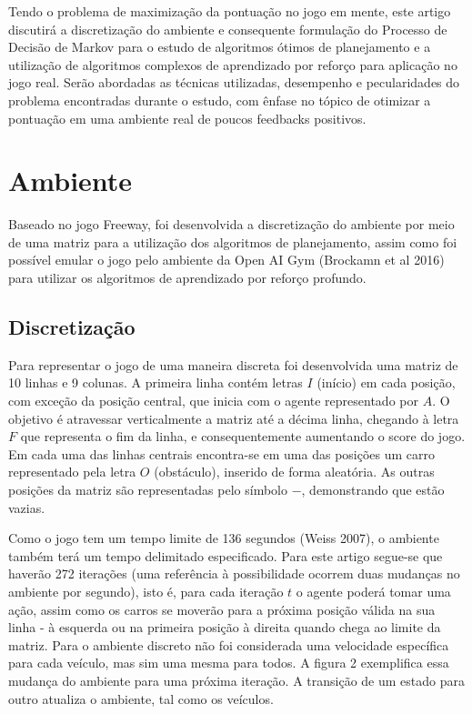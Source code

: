 \documentclass[letterpaper]{article} %
\begin{document}
Tendo o problema de maximização da pontuação no jogo em mente, este artigo discutirá a discretização do ambiente e consequente formulação do Processo de Decisão de Markov para o estudo de algoritmos ótimos de planejamento e a utilização de algoritmos complexos de aprendizado por reforço para aplicação no jogo real. Serão abordadas as técnicas utilizadas, desempenho e pecularidades do problema encontradas durante o estudo, com ênfase no tópico de otimizar a pontuação em uma ambiente real de poucos feedbacks positivos.

\section{Ambiente}
Baseado no jogo Freeway, foi desenvolvida a discretização do ambiente por meio de uma matriz para a utilização dos algoritmos de planejamento, assim como foi possível emular o jogo pelo ambiente da Open AI Gym (Brockamn et al 2016) para utilizar os algoritmos de aprendizado por reforço profundo.

\subsection{Discretização}
Para representar o jogo de uma maneira discreta foi desenvolvida uma matriz de 10 linhas e 9 colunas. A primeira linha contém letras $I$ (início) em cada posição, com exceção da posição central, que inicia com o agente representado por $A$. O objetivo é atravessar verticalmente a matriz até a décima linha, chegando à letra $F$ que representa o fim da linha, e consequentemente aumentando o score do jogo. Em cada uma das linhas centrais encontra-se em uma das posições um carro representado pela letra $O$ (obstáculo), inserido de forma aleatória. As outras posições da matriz são representadas pelo símbolo $-$, demonstrando que estão vazias. 

Como o jogo tem um tempo limite de 136 segundos (Weiss 2007), o ambiente também terá um tempo delimitado especificado. Para este artigo segue-se que haverão 272 iterações (uma referência à possibilidade ocorrem duas mudanças no ambiente por segundo), isto é, para cada iteração $t$ o agente poderá tomar uma ação, assim como os carros se moverão para a próxima posição válida na sua linha - à esquerda ou na primeira posição à direita quando chega ao limite da matriz. Para o ambiente discreto não foi considerada uma velocidade específica para cada veículo, mas sim uma mesma para todos. A figura 2 exemplifica essa mudança do ambiente para uma próxima iteração. A transição de um estado para outro atualiza o ambiente, tal como os veículos.
\end{document}
